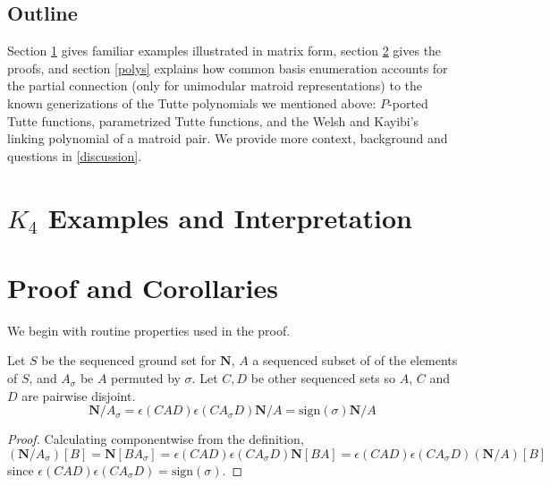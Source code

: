 \documentclass[Unicode]{cedram-alco}
\newcommand{\ext}[1]{\ensuremath{\mathbf{#1}}}
\begin{document}
\subsection{Outline}
Section \ref{examples} gives familiar examples illustrated in matrix form,
section \ref{proofs} gives the proofs, and section \ref{polys} explains
how common basis enumeration accounts for the partial connection
(only for unimodular matroid representations) to the known generizations
of the Tutte polynomials we mentioned above: $P$-ported Tutte functions,
parametrized Tutte functions, and the Welsh and Kayibi's linking polynomial
of a matroid pair. We provide more context, background and questions 
in \ref{discussion}.


\section{$K_4$ Examples and Interpretation}\label{examples}







\section{Proof and Corollaries}\label{proofs}

We begin with routine properties used in the proof.

    \begin{prop}
      Let $S$ be the sequenced ground set for $\ext{N}$, $A$ a sequenced subset of
      of the elements of $S$, and $A_\sigma$ be $A$ permuted by $\sigma$.  Let $C, D$ be other sequenced
      sets so $A$, $C$ and $D$ are pairwise disjoint.
      \begin{equation}\label{permuteContraction}
        \ext{N}/A_\sigma = \epsilon(CAD)\epsilon(CA_\sigma D)\ext{N}/A = \text{sign}(\sigma)\ext{N}/A
      \end{equation}
    \end{prop}
    \begin{proof}
      Calculating componentwise from the definition,
      \[
      (\ext{N}/A_\sigma)[B]=\ext{N}[BA_\sigma]=\epsilon(CAD)\epsilon(CA_\sigma D)\ext{N}[BA]=
      \epsilon(CAD)\epsilon(CA_\sigma D)(\ext{N}/A)[B]
      \]
      since $\epsilon(CAD)\epsilon(CA_\sigma D)=\text{sign}(\sigma)$.
    \end{proof}
\end{document}
